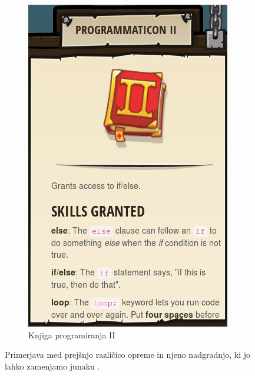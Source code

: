 \begin{figure}[h!]
\begin{subfigure}[]{0.25\textwidth}
        \includegraphics[width=\textwidth]{./images/sc_web/cc_EQ-P2-v01.jpg}
        \caption{Knjiga programiranja II}
        \label{fig:cc:eq:p2}
    \end{subfigure}
    \caption{Primerjava med prejšnjo različico opreme in njeno
      nadgradnjo, ki jo lahko zamenjamo junaku \cite{web:codecombat}.}
   \label{fig:web:cc:EQ:Primerjava}
\end{figure} 


